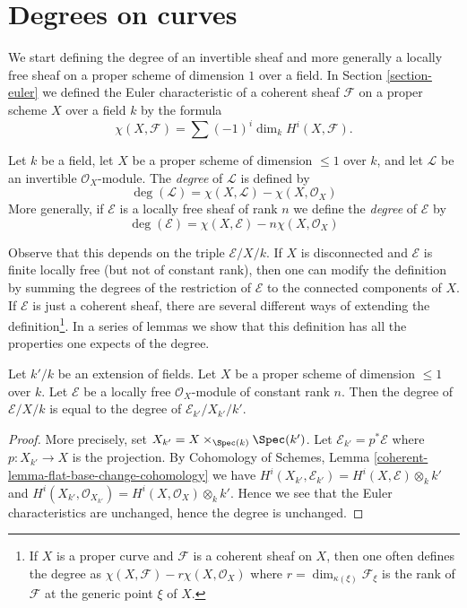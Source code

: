 \section{Degrees on curves}
\label{section-divisors-curves}

\noindent
We start defining the degree of an invertible sheaf and more generally
a locally free sheaf on a proper scheme
of dimension $1$ over a field. In Section \ref{section-euler}
we defined the Euler characteristic
of a coherent sheaf $\mathcal{F}$ on a proper scheme $X$ over a field
$k$ by the formula
$$
\chi(X, \mathcal{F}) = \sum (-1)^i \dim_k H^i(X, \mathcal{F}).
$$

\begin{definition}
\label{definition-degree-invertible-sheaf}
Let $k$ be a field, let $X$ be a proper scheme of dimension $\leq 1$
over $k$, and let $\mathcal{L}$ be an invertible $\mathcal{O}_X$-module.
The {\it degree} of $\mathcal{L}$ is defined by
$$
\deg(\mathcal{L}) = \chi(X, \mathcal{L}) - \chi(X, \mathcal{O}_X)
$$
More generally, if $\mathcal{E}$ is a locally free sheaf of rank $n$
we define the {\it degree} of $\mathcal{E}$ by
$$
\deg(\mathcal{E}) = \chi(X, \mathcal{E}) - n\chi(X, \mathcal{O}_X)
$$
\end{definition}

\noindent
Observe that this depends on the triple $\mathcal{E}/X/k$.
If $X$ is disconnected and $\mathcal{E}$ is finite locally free (but not
of constant rank), then one can modify the definition by summing the degrees
of the restriction of $\mathcal{E}$ to the connected components of $X$.
If $\mathcal{E}$ is just a coherent sheaf, there are several different
ways of extending the definition\footnote{If $X$ is a proper curve
and $\mathcal{F}$ is a coherent sheaf on $X$, then one often defines
the degree as $\chi(X, \mathcal{F}) - r\chi(X, \mathcal{O}_X)$
where $r = \dim_{\kappa(\xi)} \mathcal{F}_\xi$ is the rank of $\mathcal{F}$
at the generic point $\xi$ of $X$.}.
In a series of lemmas we show that this definition has all the properties
one expects of the degree.

\begin{lemma}
\label{lemma-degree-base-change}
Let $k'/k$ be an extension of fields. Let $X$ be a proper scheme of
dimension $\leq 1$ over $k$. Let $\mathcal{E}$ be a locally free
$\mathcal{O}_X$-module of constant rank $n$. Then the degree of
$\mathcal{E}/X/k$ is equal to the degree of
$\mathcal{E}_{k'}/X_{k'}/k'$.
\end{lemma}

\begin{proof}
More precisely, set $X_{k'} = X \times_{\Spec(k)} \Spec(k')$.
Let $\mathcal{E}_{k'} = p^*\mathcal{E}$ where $p : X_{k'} \to X$
is the projection. By
Cohomology of Schemes, Lemma \ref{coherent-lemma-flat-base-change-cohomology}
we have
$H^i(X_{k'}, \mathcal{E}_{k'}) = H^i(X, \mathcal{E}) \otimes_k k'$
and
$H^i(X_{k'}, \mathcal{O}_{X_{k'}}) = H^i(X, \mathcal{O}_X) \otimes_k k'$.
Hence we see that the Euler characteristics are unchanged, hence the
degree is unchanged.
\end{proof}

